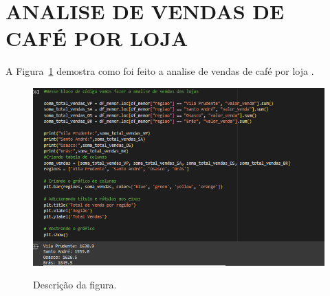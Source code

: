 \section{ANALISE DE VENDAS DE CAFÉ POR LOJA}
	\label{sec:identificao}
\label{sec:figura}
A Figura~\ref{figuras/figuras/configuraçao-analise-vendas-lojas.png} demostra como foi feito a analise de vendas de café por loja .
\begin{figure}[!ht]
	{\centering
		\caption{Descrição da figura.}
		\includegraphics[width=1.0\textwidth]{figuras/configuraçao-analise-vendas-lojas.png}
		\label{figuras/figuras/configuraçao-analise-vendas-lojas.png}
	}
\end{figure} \\ \\ \\ \\ \\ \\ \\  \\ \\ \\ \\ \\ 

